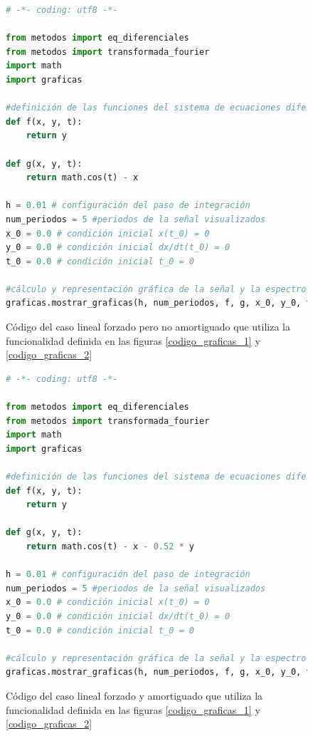 \documentclass[11pt]{article}
\begin{document}
\begin{figure}
\begin{lstlisting}[language=Python]
# -*- coding: utf8 -*- 

from metodos import eq_diferenciales
from metodos import transformada_fourier
import math
import graficas

#definición de las funciones del sistema de ecuaciones diferenciales
def f(x, y, t):
	return y

def g(x, y, t):
	return math.cos(t) - x

h = 0.01 # configuración del paso de integración
num_periodos = 5 #periodos de la señal visualizados
x_0 = 0.0 # condición inicial x(t_0) = 0
y_0 = 0.0 # condición inicial dx/dt(t_0) = 0
t_0 = 0.0 # condición inicial t_0 = 0

#cálculo y representación gráfica de la señal y la espectro de potencias
graficas.mostrar_graficas(h, num_periodos, f, g, x_0, y_0, t_0, 'oscilador lineal forzado no amortiguado', 'memoria/caso_forzado.pdf')
\end{lstlisting}
\caption{Código del caso lineal forzado pero no amortiguado que utiliza la funcionalidad definida en las
figuras \ref{codigo_graficas_1} y \ref{codigo_graficas_2}}
\end{figure}

\begin{figure}
\begin{lstlisting}[language=Python]
# -*- coding: utf8 -*- 

from metodos import eq_diferenciales
from metodos import transformada_fourier
import math
import graficas

#definición de las funciones del sistema de ecuaciones diferenciales
def f(x, y, t):
	return y

def g(x, y, t):
	return math.cos(t) - x - 0.52 * y

h = 0.01 # configuración del paso de integración
num_periodos = 5 #periodos de la señal visualizados
x_0 = 0.0 # condición inicial x(t_0) = 0
y_0 = 0.0 # condición inicial dx/dt(t_0) = 0
t_0 = 0.0 # condición inicial t_0 = 0

#cálculo y representación gráfica de la señal y la espectro de potencias
graficas.mostrar_graficas(h, num_periodos, f, g, x_0, y_0, t_0, 'oscilador lineal forzado y amortiguado', 'memoria/caso_forzado_amortiguado.pdf')
\end{lstlisting}
\caption{Código del caso lineal forzado y amortiguado que utiliza la funcionalidad definida en las
figuras \ref{codigo_graficas_1} y \ref{codigo_graficas_2}}
\end{figure}
\end{document}
